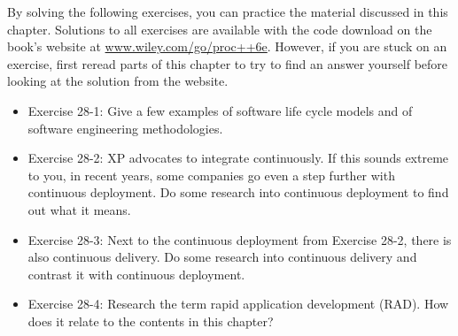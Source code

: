 By solving the following exercises, you can practice the material discussed in this chapter. Solutions to all exercises are available with the code download on the book’s website at \url{www.wiley.com/go/proc++6e}. However, if you are stuck on an exercise, first reread parts of this chapter to try to find an answer yourself before looking at the solution from the website.

\begin{itemize}
\item
Exercise 28-1: Give a few examples of software life cycle models and of software engineering methodologies.

\item
Exercise 28-2: XP advocates to integrate continuously. If this sounds extreme to you, in recent years, some companies go even a step further with continuous deployment. Do some research into continuous deployment to find out what it means.

\item
Exercise 28-3: Next to the continuous deployment from Exercise 28-2, there is also continuous delivery. Do some research into continuous delivery and contrast it with continuous deployment.

\item
Exercise 28-4: Research the term rapid application development (RAD). How does it relate to the contents in this chapter?
\end{itemize}










